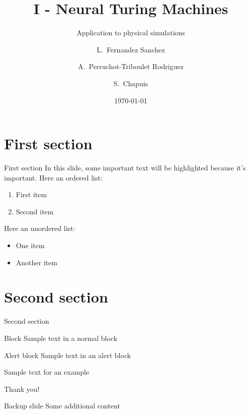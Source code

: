 \documentclass{beamer}
\title{I - Neural Turing Machines}
\subtitle{Application to physical simulations}
\author[Lucia Fernandez Sanchez, Alexandra Perruchot-Triboulet Rodriguez, Samuel Chapuis]{L.~Fernandez Sanchez \and A.~Perruchot-Triboulet Rodriguez \and S.~Chapuis}
\date{\today}
\begin{document}
\frame{\titlepage}

\section{First section}

    \begin{frame}{First section}
        In this slide, some important text will be
        \alert{highlighted} because it's important.
        Here an ordered list:
        \begin{enumerate}
            \item First item
            \item Second item
        \end{enumerate}
        Here an unordered list: 
        \begin{itemize}
            \item One item
            \item Another item
        \end{itemize}
    \end{frame}
    
\section{Second section}

    \begin{frame}{Second section}
        \begin{block}{Block}
            Sample text in a normal block
        \end{block}
   
        \begin{alertblock}{Alert block}
            Sample text in an alert block
        \end{alertblock}    
        
         \begin{example}
            Sample text for an example
        \end{example}
    \end{frame}

    
    \begin{emptyframe}
        Thank you!
    \end{emptyframe}

    \appendix

    \begin{frame}{Backup slide}
        Some additional content
    \end{frame}
    
\end{document}
